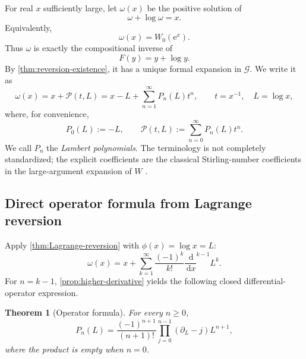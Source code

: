 \documentclass[11pt]{article}
\theoremstyle{pltheorem}
\newtheorem{theorem}{Theorem}[section]
\newcommand{\Gnear}{\mathcal G}
\newcommand{\dd}{\,\mathrm d}
\newcommand{\e}{\mathrm e}
\newcommand{\D}{\frac{\dd}{\dd x}}
\begin{document}
For real \(x\) sufficiently large, let \(\omega(x)\) be the positive solution of
\begin{equation}\label{eq:omega-equation}
 \omega+\log\omega=x.
\end{equation}
Equivalently,
\begin{equation}\label{eq:omega-W}
 \omega(x)=W_0(\e^x).
\end{equation}
Thus \(\omega\) is exactly the compositional inverse of
\begin{equation}\label{eq:F-log-map}
 F(y)=y+\log y.
\end{equation}
By \cref{thm:reversion-existence}, it has a unique formal expansion in \(\Gnear\).  We write it as
\begin{equation}\label{eq:omega-expansion}
 \omega(x)=x+\mathcal P(t,L)
 =x-L+\sum_{n=1}^{\infty}P_n(L)t^n,
 \qquad t=x^{-1},\quad L=\log x,
\end{equation}
where, for convenience,
\begin{equation}\label{eq:P0-def}
 P_0(L):=-L,
 \qquad
 \mathcal P(t,L):=\sum_{n=0}^{\infty}P_n(L)t^n.
\end{equation}
We call \(P_n\) the \emph{Lambert polynomials}.  The terminology is not completely standardized; the explicit coefficients are the classical Stirling-number coefficients in the large-argument expansion of \(W\) \cite{comtet1970,jeffrey-et-al-1995,corless-et-al-1996,dlmf-W}.

\subsection{Direct operator formula from Lagrange reversion}

Apply \cref{thm:Lagrange-reversion} with \(\phi(x)=\log x=L\):
\begin{equation}\label{eq:omega-Lagrange}
 \omega(x)=x+
 \sum_{k=1}^{\infty}\frac{(-1)^k}{k!}
 \D^{k-1}L^k.
\end{equation}
For \(n=k-1\), \cref{prop:higher-derivative} yields the following closed differential-operator expression.

\begin{theorem}[Operator formula]\label{thm:P-operator}
For every \(n\ge0\),
\begin{equation}\label{eq:P-operator}
 P_n(L)=\frac{(-1)^{n+1}}{(n+1)!}
 \prod_{j=0}^{n-1}(\partial_L-j)L^{n+1},
\end{equation}
where the product is empty when \(n=0\).
\end{theorem}
\end{document}

